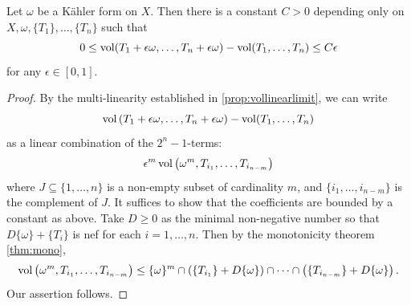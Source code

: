 \begin{lemma}\label{lma:perturbvol}
    Let $\omega$ be a Kähler form on $X$. Then there is a constant $C>0$ depending only on $X,\omega,\{T_1\},\ldots,\{T_n\}$ such that
    \[
    0\leq \operatorname{vol}(T_1+\epsilon\omega,\ldots, T_n+\epsilon\omega)-\operatorname{vol}(T_1,\ldots,T_n)\leq C\epsilon
    \]
    for any $\epsilon\in [0,1]$.
\end{lemma}
\begin{proof}
    By the multi-linearity established in \cref{prop:vollinearlimit}, we can write
    \[
        \operatorname{vol}\left(T_1+\epsilon\omega,\ldots, T_n+\epsilon\omega\right)-\operatorname{vol}(T_1,\ldots,T_n)
    \]
    as a linear combination of the $2^n-1$-terms:
    \[
        \epsilon^m\operatorname{vol}\left(\omega^m, T_{i_1},\ldots,T_{i_{n-m}} \right)
    \]
    where $J\subseteq \{1,\ldots,n\}$ is a non-empty subset of cardinality $m$, and $\{i_1,\ldots,i_{n-m}\}$ is the complement of $J$.
    It suffices to show that the coefficients are bounded by a constant as above. Take $D\geq 0$ as the minimal non-negative number so that $D\{\omega\}+\{T_i\}$ is nef for each $i=1,\ldots,n$. Then by the monotonicity theorem \cref{thm:mono},
    \[
        \operatorname{vol}\left(\omega^m, T_{i_1},\ldots,T_{i_{n-m}} \right)\leq \{\omega\}^m\cap \left( \{T_{i_1}\}+D\{\omega\} \right) \cap \cdots \cap \left( \{T_{i_{n-m}}\}+D\{\omega\} \right).
    \]
    Our assertion follows.
\end{proof}

